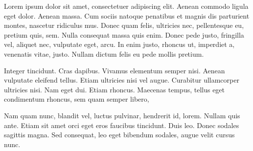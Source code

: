 \documentclass[12pt,a4paper,orderfromtodate,sigleft]{newlfm}
\begin{document}
\begin{newlfm}

Lorem ipsum dolor sit amet, consectetuer adipiscing elit.
Aenean commodo ligula eget dolor. Aenean massa.
Cum sociis natoque penatibus et magnis dis parturient montes, nascetur ridiculus mus.
Donec quam felis, ultricies nec, pellentesque eu, pretium quis, sem.
Nulla consequat massa quis enim. Donec pede justo, fringilla vel, aliquet nec, vulputate eget, arcu.
In enim justo, rhoncus ut, imperdiet a, venenatis vitae, justo. Nullam dictum felis eu pede mollis pretium.

Integer tincidunt. Cras dapibus. Vivamus elementum semper nisi. Aenean vulputate eleifend tellus.
Etiam ultricies nisi vel augue. Curabitur ullamcorper ultricies nisi. Nam eget dui.
Etiam rhoncus. Maecenas tempus, tellus eget condimentum rhoncus, sem quam semper libero,

Nam quam nunc, blandit vel, luctus pulvinar, hendrerit id, lorem.
Nullam quis ante. Etiam sit amet orci eget eros faucibus tincidunt. Duis leo.
Donec sodales sagittis magna. Sed consequat, leo eget bibendum sodales, augue velit cursus nunc.

\end{newlfm}
\end{document}
